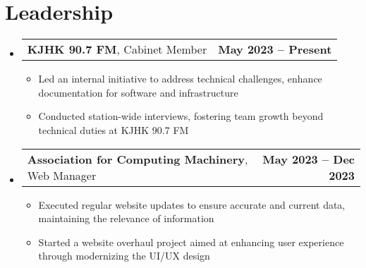 \documentclass[letter,11pt]{article}
\makeatletter
\newcommand{\resumeItem}[1]{
	\item \small{{#1 \vspace{-2pt}}}
}
\newcommand{\resumeSubheading}[3]{
	\vspace{-2pt}\item
	\begin{tabular*}{1.0\textwidth}[t]{l@{\extracolsep{\fill}}r}
		\textbf{#1}, {\small #2} & \textbf{\small #3} \\
	\end{tabular*}\vspace{-7pt}
}
\newcommand{\resumeSubHeadingListStart}{\begin{itemize}[leftmargin=0.0in, label={}]}
\newcommand{\resumeSubHeadingListEnd}{\end{itemize}}
\newcommand{\resumeItemListStart}{\begin{itemize}[leftmargin=0.5cm]}
\newcommand{\resumeItemListEnd}{\end{itemize}\vspace{-5pt}}
\makeatother
\begin{document}
\section{Leadership}
	\resumeSubHeadingListStart
		\resumeSubheading{KJHK 90.7 FM}{Cabinet Member}{May 2023 -- Present}
			\resumeItemListStart
				\resumeItem{Led an internal initiative to address technical challenges, enhance documentation for software and infrastructure}
				\resumeItem{Conducted station-wide interviews, fostering team growth beyond technical duties at KJHK 90.7 FM}
			\resumeItemListEnd
		\resumeSubheading{Association for Computing Machinery}{Web Manager}{May 2023 -- Dec 2023}
			\resumeItemListStart
				\resumeItem{Executed regular website updates to ensure accurate and current data, maintaining the relevance of information}
				\resumeItem{Started a website overhaul project aimed at enhancing user experience through modernizing the UI/UX design}
			\resumeItemListEnd
	\resumeSubHeadingListEnd
\end{document}
